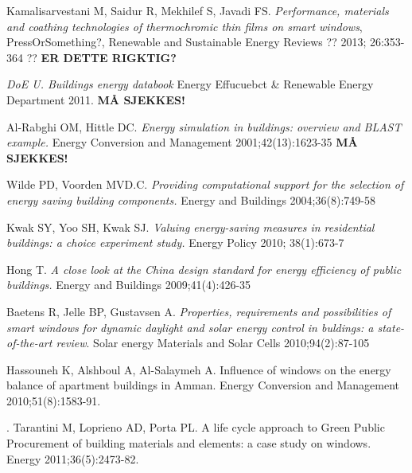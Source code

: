 \begin{thebibliography}{9}


      Kamalisarvestani M, Saidur R, Mekhilef S, Javadi FS.
      \emph{Performance, materials and coathing technologies of thermochromic thin films on smart windows}, 
      PressOrSomething?, 
      Renewable and Sustainable Energy Reviews ??
      2013; 26:353-364 ??
      \textbf{ER DETTE RIGKTIG?}

      \emph{DoE U. Buildings energy databook}
      Energy Effucuebct \& Renewable Energy Department 2011.
      \textbf{MÅ SJEKKES!}

      Al-Rabghi OM, Hittle DC.  
      \emph{Energy simulation in buildings: overview and BLAST example.} 
      Energy Conversion and Management 
      2001;42(13):1623-35 
      \textbf{MÅ SJEKKES!}

      Wilde PD, Voorden MVD.C.  
      \emph{Providing computational support for the selection of energy saving building components.} 
      Energy and Buildings 
      2004;36(8):749-58

      Kwak SY, Yoo SH, Kwak SJ.
      \emph{Valuing energy-saving measures in residential buildings: a choice experiment study.}
      Energy Policy
      2010; 38(1):673-7

      Hong T. 
      \emph{A close look at the China design standard for energy efficiency of public buildings.}
      Energy and Buildings
      2009;41(4):426-35

      Baetens R, Jelle BP, Gustavsen A.
      \emph{Properties, requirements and possibilities of smart windows for dynamic daylight and solar energy control in buldings: a state-of-the-art review}.
      Solar energy Materials and Solar Cells
      2010;94(2):87-105

      Hassouneh K, Alshboul A, Al-Salaymeh A.
      Influence of windows on the energy balance of apartment buildings in Amman.
      Energy Conversion and Management 2010;51(8):1583-91.

      .
      Tarantini M, Loprieno AD, Porta PL.
      A life cycle approach to Green Public Procurement of building materials and elements: 
      a case study on windows.
      Energy 2011;36(5):2473-82.


\end{thebibliography}
